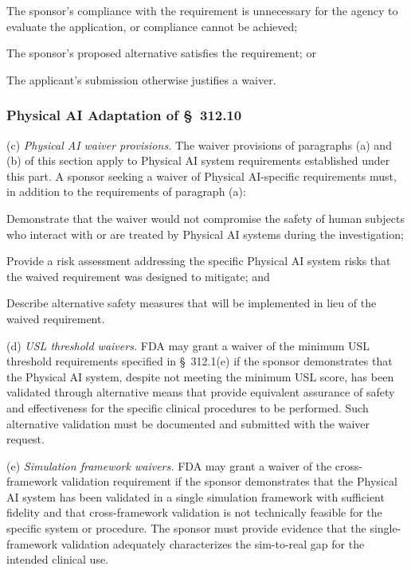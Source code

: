 \documentclass[11pt]{article}
\begin{document}
\begin{description}[leftmargin=0.5cm,style=sameline]
\item[(1)] The sponsor's compliance with the requirement is unnecessary for the agency to evaluate the application, or compliance cannot be achieved;
\item[(2)] The sponsor's proposed alternative satisfies the requirement; or
\item[(3)] The applicant's submission otherwise justifies a waiver.
\end{description}

\subsubsection{Physical AI Adaptation of \S~312.10}

(c) \textit{Physical AI waiver provisions.} The waiver provisions of paragraphs (a) and (b) of this section apply to Physical AI system requirements established under this part. A sponsor seeking a waiver of Physical AI-specific requirements must, in addition to the requirements of paragraph (a):

\begin{description}[leftmargin=0.8cm,style=sameline]
\item[(i)] Demonstrate that the waiver would not compromise the safety of human subjects who interact with or are treated by Physical AI systems during the investigation;
\item[(ii)] Provide a risk assessment addressing the specific Physical AI system risks that the waived requirement was designed to mitigate; and
\item[(iii)] Describe alternative safety measures that will be implemented in lieu of the waived requirement.
\end{description}

(d) \textit{USL threshold waivers.} FDA may grant a waiver of the minimum USL threshold requirements specified in \S~312.1(e) if the sponsor demonstrates that the Physical AI system, despite not meeting the minimum USL score, has been validated through alternative means that provide equivalent assurance of safety and effectiveness for the specific clinical procedures to be performed. Such alternative validation must be documented and submitted with the waiver request.

(e) \textit{Simulation framework waivers.} FDA may grant a waiver of the cross-framework validation requirement if the sponsor demonstrates that the Physical AI system has been validated in a single simulation framework with sufficient fidelity and that cross-framework validation is not technically feasible for the specific system or procedure. The sponsor must provide evidence that the single-framework validation adequately characterizes the sim-to-real gap for the intended clinical use.
\end{document}
